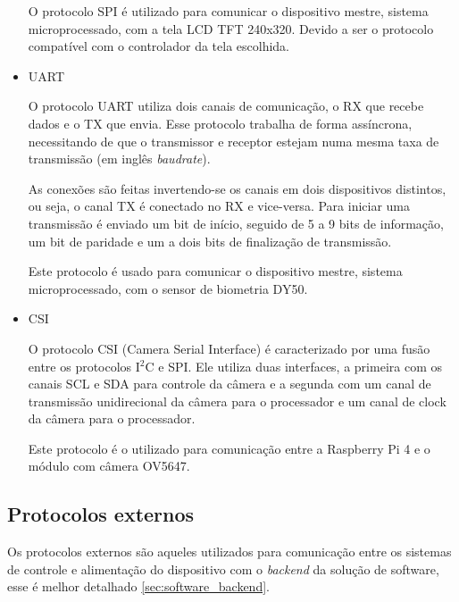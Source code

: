 \begin{itemize}
    O protocolo SPI é utilizado para comunicar o dispositivo mestre, sistema microprocessado, com a tela LCD TFT 240x320. Devido a ser o protocolo compatível com o controlador da tela escolhida.
    
    
    \item UART
    
    O protocolo UART utiliza dois canais de comunicação, o RX que recebe dados e o TX que envia. Esse protocolo trabalha de forma assíncrona, necessitando de que o transmissor e receptor estejam numa mesma taxa de transmissão (em inglês \textit{baudrate}).
    
    As conexões são feitas invertendo-se os canais em dois dispositivos distintos, ou seja, o canal TX é conectado no RX e vice-versa. Para iniciar uma transmissão é enviado um bit de início, seguido de 5 a 9 bits de informação, um bit de paridade e um a dois bits de finalização de transmissão.
    
    Este protocolo é usado para comunicar o dispositivo mestre, sistema microprocessado, com o sensor de biometria DY50. 
    
    \item CSI
    
    O protocolo CSI (Camera Serial Interface) é caracterizado por uma fusão entre os protocolos I$^2$C e SPI. Ele utiliza duas interfaces, a primeira com os canais SCL e SDA para controle da câmera e a segunda com um canal de transmissão unidirecional da câmera para o processador e um canal de clock da câmera para o processador.
    
    Este protocolo é o utilizado para comunicação entre a Raspberry Pi 4 e o módulo com câmera OV5647.
    
    
    
\end{itemize}
\subsection{Protocolos externos}

Os protocolos externos são aqueles utilizados para comunicação entre os sistemas de controle e alimentação do dispositivo com o \textit{backend} da solução de software, esse é melhor detalhado \ref{sec:software_backend}.

